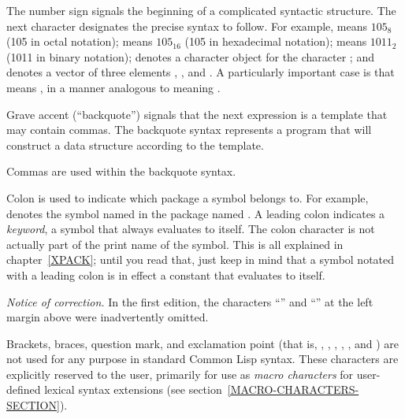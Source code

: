 \begin{indentdesc}{1.2pc}
\item[\cd{\#}] The number sign signals the beginning of a
complicated syntactic structure.
The next character designates the precise syntax to follow.
For example,  means $105_{8}$ (105 in octal notation);
 means $105_{16}$ (105 in hexadecimal notation);
 means $1011_{2}$ (1011 in binary notation);
 denotes a character object for the character ; and
 denotes a vector of three elements , , and .
A particularly important case is that  means ,
in a manner analogous to  meaning .

\item[\cd{{\Xbq}}] Grave accent (``backquote'') signals that
the next expression is a template that may contain commas.  The backquote syntax
represents a program that will construct a data structure
according to the template.

\item[\cd{,}] Commas are used within the backquote syntax.

\item[\cd{:}] Colon is used to indicate which package a
symbol belongs to. For example,  denotes the symbol named
 in the package named .  A leading colon indicates a {\it
keyword}, a symbol that always evaluates to itself.
The colon character is not actually part of the print name
of the symbol.
This is all explained in chapter~\ref{XPACK}; until you read
that, just keep in mind that a symbol notated with a leading colon
is in effect a constant that evaluates to itself.
\end{indentdesc}


\begin{new}%
{\it Notice of correction.}
In the first edition, the characters ``\cd{,}'' and ``\cd{:}'' at the
left margin above were inadvertently omitted.
\end{new}

Brackets, braces, question mark, and exclamation point
(that is, \cd{{\Xlbracket}}, \cd{{\Xrbracket}}, \cd{{\Xlbrace}}, \cd{{\Xrbrace}},
, and \cd{!}) are not used for any purpose in standard Common Lisp syntax.
These characters are explicitly reserved to the user, primarily
for use as {\it macro characters} for user-defined lexical syntax extensions
(see section~\ref{MACRO-CHARACTERS-SECTION}).

